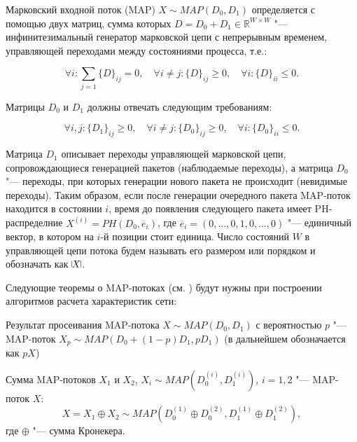 
Марковский входной поток (MAP) \cite{Neuts1979, Dudin2000} $X \sim MAP(D_{0},D_{1})$ определяется с помощью двух матриц, сумма которых $D=D_{0}+D_{1} \in \mathbb{R}^{W \times W}$ "--- инфинитезимальный генератор марковской цепи с непрерывным временем, управляющей переходами между состояниями процесса, т.е.:

\begin{equation}
	\label{eq:ch4_infinitesimal_constraints}
	\forall i: \sum\limits_{j=1} \{D\}_{ij} = 0, \quad
	\forall i \neq j: \{D\}_{ij} \geq 0, \quad
	\forall i: \{D\}_{ii} \leq 0.
\end{equation}

Матрицы $D_{0}$ и $D_{1}$ должны отвечать следующим требованиям:

\begin{equation}
	\label{eq:ch4_map_constraints}
	\forall i, j: \{D_{1}\}_{ij} \geq 0,\quad
	\forall i \neq j: \{D_{0}\}_{ij} \geq 0, \quad
	\forall i: \{D_{0}\}_{ii} \leq 0.
\end{equation}

Матрица $D_1$ описывает переходы управляющей марковской цепи, сопровождающиеся генерацией пакетов (наблюдаемые переходы), а матрица $D_0$ "--- переходы, при которых генерации нового пакета не происходит (невидимые переходы). Таким образом, если после генерации очередного пакета MAP-поток находится в состоянии $i$, время до появления следующего пакета имеет PH-распределние $X^{(i)} = PH(D_0, \overline{e}_i)$, где $\overline{e}_i = (0, \dots, 0, 1, 0, \dots, 0)$ "--- единичный вектор, в котором на $i$-й позиции стоит единица. Число состояний $W$ в управляющей цепи потока будем называть его размером или порядком и обозначать как $\vline X \vline$.


Следующие теоремы о MAP-потоках (см. \cite{VishnevskyDudin2018}) будут нужны при построении алгоритмов расчета характеристик сети:

\begin{thm}\label{th:ch4_sifted_map}
  Результат просеивания MAP-потока $X \sim MAP(D_{0},D_{1})$ с вероятностью $p$ "--- MAP-поток $X_{p} \sim MAP(D_{0}+(1-p)D_{1},pD_{1})$ (в дальнейшем обозначается как $pX$)
\end{thm}

\begin{thm}\label{th:ch4_maps_sum}
  Сумма MAP-потоков $X_{1}$ и $X_{2}$, $X_i \sim MAP(D_{0}^{(i)},D_{1}^{(i)})$, $i=1,2$ "--- MAP-поток $X$:
  $$
    X = X_{1} \oplus X_{2} \sim MAP(D_{0}^{(1)} \oplus D_{0}^{(2)},D_{1}^{(1)} \oplus D_{1}^{(2)}),
  $$
  где $\oplus$ "--- сумма Кронекера.
\end{thm}

